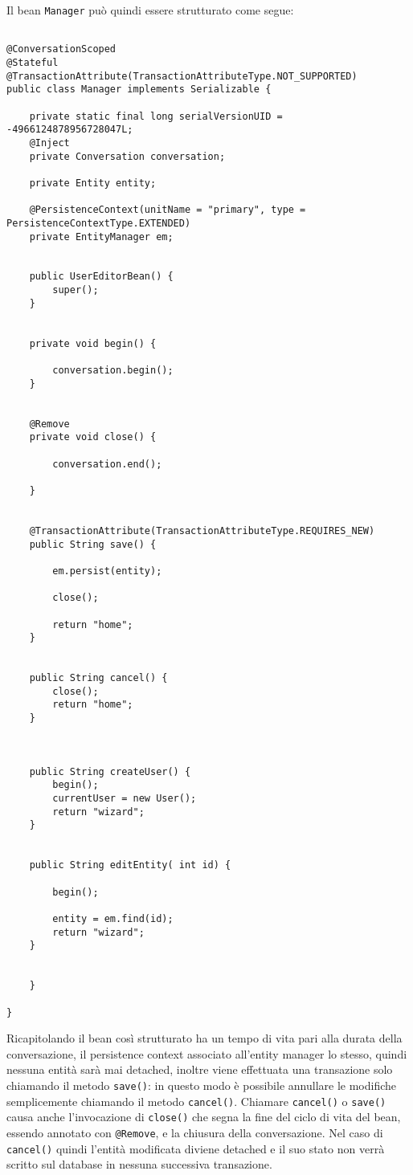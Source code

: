 Il bean \texttt{Manager} può quindi essere strutturato come segue:

\begin{lstlisting}
 
@ConversationScoped
@Stateful
@TransactionAttribute(TransactionAttributeType.NOT_SUPPORTED)
public class Manager implements Serializable {

	private static final long serialVersionUID = -4966124878956728047L;
	@Inject
	private Conversation conversation;

	private Entity entity;

	@PersistenceContext(unitName = "primary", type = PersistenceContextType.EXTENDED)
	private EntityManager em;


	public UserEditorBean() {
		super();
	}


	private void begin() {

		conversation.begin();
	}


	@Remove
	private void close() {

		conversation.end();

	}


	@TransactionAttribute(TransactionAttributeType.REQUIRES_NEW)
	public String save() {
		
		em.persist(entity);
		
		close();

		return "home";
	}


	public String cancel() {
		close();
		return "home";
	}


	
	public String createUser() {
		begin();
		currentUser = new User();
		return "wizard";
	}


	public String editEntity( int id) {

		begin();

		entity = em.find(id);
		return "wizard";
	}


	}

}
\end{lstlisting}

Ricapitolando il bean così strutturato ha un tempo di vita pari alla durata della conversazione, il persistence context associato all'entity manager lo stesso, quindi nessuna entità sarà mai detached, inoltre viene effettuata una
transazione solo chiamando il metodo \texttt{save()}: in questo modo è possibile annullare le modifiche semplicemente chiamando il metodo \texttt{cancel()}. Chiamare \texttt{cancel()} o \texttt{save()} causa
anche l'invocazione di \texttt{close()} che segna la fine del ciclo di vita del bean, essendo annotato con \texttt{@Remove}, e la chiusura della conversazione.
Nel caso di \texttt{cancel()} quindi l'entità modificata diviene detached e il suo stato non verrà scritto sul database in nessuna successiva transazione.





